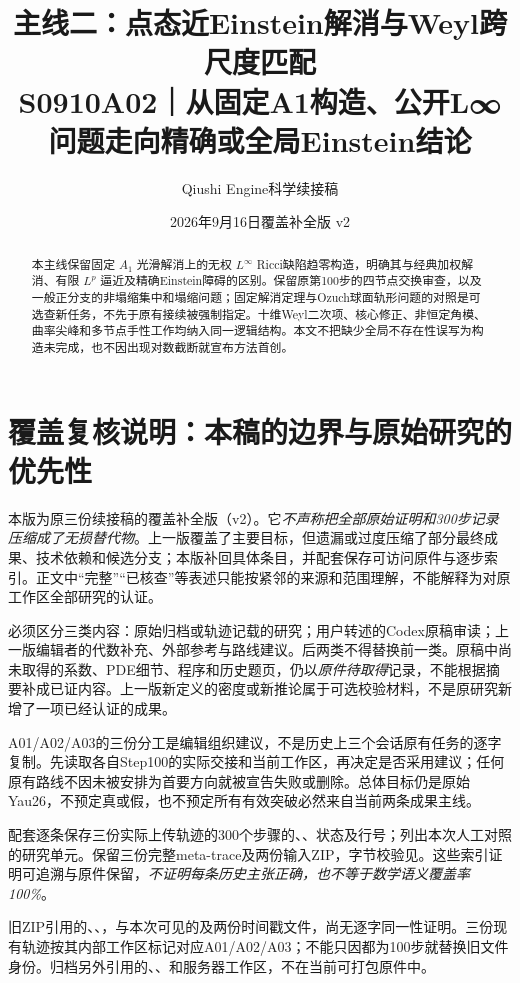 \documentclass[UTF8,a4paper,11pt,fontset=fandol]{ctexart}
\title{主线二：点态近Einstein解消与Weyl跨尺度匹配\\[0.5em]{\large S0910A02｜从固定A1构造、公开L∞问题走向精确或全局Einstein结论}}
\author{Qiushi Engine\quad 科学续接稿}
\date{2026年9月16日\quad 覆盖补全版 v2}
\numberwithin{equation}{section}
\theoremstyle{definition}
\begin{document}
\maketitle
\begin{abstract}
本主线保留固定 $A_1$ 光滑解消上的无权 $L^\infty$ Ricci缺陷趋零构造，明确其与经典加权解消、有限 $L^p$ 逼近及精确Einstein障碍的区别。保留原第100步的四节点交换审查，以及一般正分支的非塌缩集中和塌缩问题；固定解消定理与Ozuch球面轨形问题的对照是可选查新任务，不先于原有接续被强制指定。十维Weyl二次项、核心修正、非恒定角模、曲率尖峰和多节点手性工作均纳入同一逻辑结构。本文不把缺少全局不存在性误写为构造未完成，也不因出现对数截断就宣布方法首创。
\end{abstract}
\begingroup
\small\linespread{1.0}\selectfont\setlength{\parskip}{0pt}
\tableofcontents
\endgroup
\clearpage

\section*{覆盖复核说明：本稿的边界与原始研究的优先性}
本版为原三份续接稿的覆盖补全版（v2）。它\emph{不声称把全部原始证明和300步记录压缩成了无损替代物}。上一版覆盖了主要目标，但遗漏或过度压缩了部分最终成果、技术依赖和候选分支；本版补回具体条目，并配套保存可访问原件与逐步索引。正文中“完整”“已核查”等表述只能按紧邻的来源和范围理解，不能解释为对原工作区全部研究的认证。

必须区分三类内容：原始归档或轨迹记载的研究；用户转述的Codex原稿审读；上一版编辑者的代数补充、外部参考与路线建议。后两类不得替换前一类。原稿中尚未取得的系数、PDE细节、程序和历史题页，仍以\emph{原件待取得}记录，不能根据摘要补成已证内容。上一版新定义的密度或新推论属于可选校验材料，不是原研究新增了一项已经认证的成果。

A01/A02/A03的三份分工是编辑组织建议，不是历史上三个会话原有任务的逐字复制。先读取各自Step100的实际交接和当前工作区，再决定是否采用建议；任何原有路线不因未被安排为首要方向就被宣告失败或删除。总体目标仍是原始Yau26，不预定真或假，也不预定所有有效突破必然来自当前两条成果主线。

配套逐条保存三份实际上传轨迹的300个步骤的、、状态及行号；列出本次人工对照的研究单元。保留三份完整meta-trace及两份输入ZIP，字节校验见。这些索引证明可追溯与原件保留，\emph{不证明每条历史主张正确，也不等于数学语义覆盖率100\%}。

旧ZIP引用的、、，与本次可见的及两份时间戳文件，尚无逐字同一性证明。三份现有轨迹按其内部工作区标记对应A01/A02/A03；不能只因都为100步就替换旧文件身份。归档另外引用的、、和服务器工作区，不在当前可打包原件中。
\end{document}
